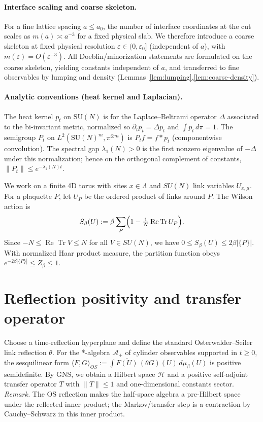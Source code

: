 \documentclass[11pt]{amsart}
\theoremstyle{plain}
\theoremstyle{definition}
\theoremstyle{remark}
\begin{document}
\paragraph{Interface scaling and coarse skeleton.}
For a fine lattice spacing $a\le a_0$, the number of interface coordinates at the cut scales as $m(a)\asymp a^{-3}$ for a fixed physical slab. We therefore introduce a coarse skeleton at fixed physical resolution $\varepsilon\in(0,\varepsilon_0]$ (independent of $a$), with $m(\varepsilon)=O(\varepsilon^{-3})$. All Doeblin/minorization statements are formulated on the coarse skeleton, yielding constants independent of $a$, and transferred to fine observables by lumping and density (Lemmas~\ref{lem:lumping},\ref{lem:coarse-density}).

\paragraph{Analytic conventions (heat kernel and Laplacian).}
The heat kernel $p_t$ on $\mathrm{SU}(N)$ is for the Laplace--Beltrami operator $\Delta$ associated to the bi-invariant metric, normalized so $\partial_t p_t = \Delta p_t$ and $\int p_t\,d\pi=1$. The semigroup $P_t$ on $L^2(\mathrm{SU}(N)^m,\pi^{\otimes m})$ is $P_t f = f* p_t$ (componentwise convolution). The spectral gap $\lambda_1(N)>0$ is the first nonzero eigenvalue of $-\Delta$ under this normalization; hence on the orthogonal complement of constants, $\|P_t\| \le e^{-\lambda_1(N) t}$.

We work on a finite 4D torus with sites $x\in\Lambda$ and $SU(N)$ link variables $U_{x,\mu}$. For a plaquette $P$, let $U_P$ be the ordered product of links around $P$. The Wilson action is
\[
 S_{\beta}(U) := \beta \sum_{P} \Bigl(1 - \tfrac{1}{N} \operatorname{Re} \operatorname{Tr} U_P\Bigr).
\]
Since $-N\le \operatorname{Re} \operatorname{Tr} V \le N$ for all $V\in SU(N)$, we have $0\le S_{\beta}(U)\le 2\beta |\{P\}|$. With normalized Haar product measure, the partition function obeys $e^{-2\beta |\{P\}|}\le Z_{\beta}\le 1$.
\section{Reflection positivity and transfer operator}

Choose a time-reflection hyperplane and define the standard Osterwalder--Seiler link reflection $\theta$. For the *-algebra $\mathcal A_+$ of cylinder observables supported in $t\ge 0$, the sesquilinear form $\langle F,G\rangle_{OS}:=\int \overline{F(U)}\,(\theta G)(U)\, d\mu_{\beta}(U)$ is positive semidefinite. By GNS, we obtain a Hilbert space $\mathcal H$ and a positive self-adjoint transfer operator $T$ with $\lVert T\rVert\le 1$ and one-dimensional constants sector.
\smallskip
\noindent\emph{Remark.} The OS reflection makes the half-space algebra a pre-Hilbert space under the reflected inner product; the Markov/transfer step is a contraction by Cauchy–Schwarz in this inner product.
\end{document}
